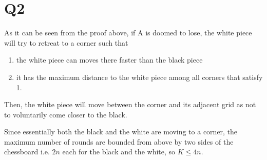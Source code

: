 \documentclass[a4paper]{article}
\begin{document}
\section*{Q2}

As it can be seen from the proof above, if A is doomed to lose, the white piece
will try to retreat to a corner such that
\begin{enumerate}
    \item the white piece can moves there faster than the black piece
    \item it has the maximum distance to the white piece among all corners that
    satisfy 1.
\end{enumerate}

Then, the white piece will move between the corner and its adjacent grid as not
to voluntarily come closer to the black.

Since essentially both the black and the white are moving to a corner, the
maximum number of rounds are bounded from above by two sides of the chessboard
i.e. $2n$ each for the black and the white, so $K \leq 4n$.
\end{document}
